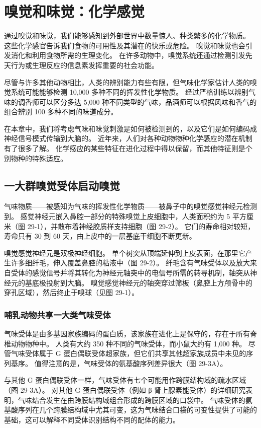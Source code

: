\chapter{嗅觉和味觉：化学感觉}
通过嗅觉和味觉，我们能够感知到外部世界中数量惊人、种类繁多的化学物质。 这些化学感官告诉我们食物的可用性及其潜在的快乐或危险。 嗅觉和味觉也会引发消化和利用食物所需的生理变化。 在许多动物中，嗅觉系统还通过检测引发先天行为或生理反应的信息素发挥重要的社会功能。

尽管与许多其他动物相比，人类的辨别能力有些有限，但气味化学家估计人类的嗅觉系统可能能够检测 10,000 多种不同的挥发性化学物质。 经过严格训练以辨别气味的调香师可以区分多达 5,000 种不同类型的气味，品酒师可以根据风味和香气的组合辨别 100 多种不同的味道成分。

在本章中，我们将考虑气味和味觉刺激是如何被检测到的，以及它们是如何编码成神经信号模式传输到大脑的。 近年来，人们对各种动物物种化学感应的潜在机制有了很多了解。 化学感应的某些特征在进化过程中得以保留，而其他特征则是个别物种的特殊适应。

\section{一大群嗅觉受体启动嗅觉}
气味物质——被感知为气味的挥发性化学物质——被鼻子中的嗅觉感觉神经元检测到。 感觉神经元嵌入鼻腔一部分的特殊嗅觉上皮细胞中，人类面积约为 5 平方厘米（图 29-1），并散布着神经胶质样支持细胞（图 29-2）。 它们的寿命相对较短，寿命只有 30 到 60 天，由上皮中的一层基底干细胞不断更新。

嗅觉感觉神经元是双极神经细胞。 单个树突从顶端延伸到上皮表面，在那里它产生许多细纤毛，伸入覆盖鼻腔的粘液中（图 29-2）。 纤毛含有气味受体以及放大来自受体的感觉信号并将其转化为神经元轴突中的电信号所需的转导机制，轴突从神经元的基底极投射到大脑。 嗅觉感觉神经元的轴突穿过筛板（鼻腔上方颅骨中的穿孔区域），然后终止于嗅球（见图 29-1）。

\subsection{哺乳动物共享一大类气味受体}
气味受体是由多基因家族编码的蛋白质，该家族在进化上是保守的，存在于所有脊椎动物物种中。 人类有大约 350 种不同的气味受体，而小鼠大约有 1,000 种。 尽管气味受体属于 G 蛋白偶联受体超家族，但它们共享其他超家族成员中未见的序列基序。 值得注意的是，气味受体的氨基酸序列差异很大（图 29-3A）。

与其他 G 蛋白偶联受体一样，气味受体有七个可能用作跨膜结构域的疏水区域（图 29-3A）。 对其他 G 蛋白偶联受体（例如 β-肾上腺素能受体）的详细研究表明，气味结合发生在由跨膜结构域组合形成的跨膜区域的口袋中。 气味受体的氨基酸序列在几个跨膜结构域中尤其可变，这为气味结合口袋的可变性提供了可能的基础，这可以解释不同受体识别结构不同的配体的能力。

